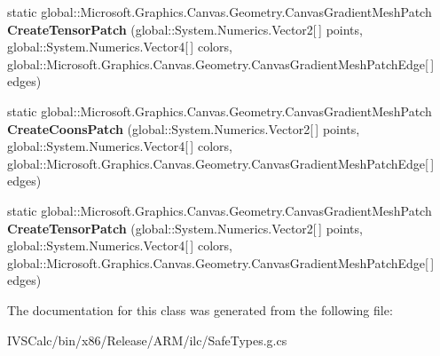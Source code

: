 \begin{DoxyCompactItemize}
static global\+::\+Microsoft.\+Graphics.\+Canvas.\+Geometry.\+Canvas\+Gradient\+Mesh\+Patch {\bfseries Create\+Tensor\+Patch} (global\+::\+System.\+Numerics.\+Vector2\mbox{[}$\,$\mbox{]} points, global\+::\+System.\+Numerics.\+Vector4\mbox{[}$\,$\mbox{]} colors, global\+::\+Microsoft.\+Graphics.\+Canvas.\+Geometry.\+Canvas\+Gradient\+Mesh\+Patch\+Edge\mbox{[}$\,$\mbox{]} edges)
\item 
\mbox{\label{class_microsoft_1_1_graphics_1_1_canvas_1_1_geometry_1_1_canvas_gradient_mesh_a1250e69d906353253b5c257cb7b7fb9f}} 
static global\+::\+Microsoft.\+Graphics.\+Canvas.\+Geometry.\+Canvas\+Gradient\+Mesh\+Patch {\bfseries Create\+Coons\+Patch} (global\+::\+System.\+Numerics.\+Vector2\mbox{[}$\,$\mbox{]} points, global\+::\+System.\+Numerics.\+Vector4\mbox{[}$\,$\mbox{]} colors, global\+::\+Microsoft.\+Graphics.\+Canvas.\+Geometry.\+Canvas\+Gradient\+Mesh\+Patch\+Edge\mbox{[}$\,$\mbox{]} edges)
\item 
\mbox{\label{class_microsoft_1_1_graphics_1_1_canvas_1_1_geometry_1_1_canvas_gradient_mesh_a354ddcec29b2b78440f0ed1529ae8d0d}} 
static global\+::\+Microsoft.\+Graphics.\+Canvas.\+Geometry.\+Canvas\+Gradient\+Mesh\+Patch {\bfseries Create\+Tensor\+Patch} (global\+::\+System.\+Numerics.\+Vector2\mbox{[}$\,$\mbox{]} points, global\+::\+System.\+Numerics.\+Vector4\mbox{[}$\,$\mbox{]} colors, global\+::\+Microsoft.\+Graphics.\+Canvas.\+Geometry.\+Canvas\+Gradient\+Mesh\+Patch\+Edge\mbox{[}$\,$\mbox{]} edges)
\end{DoxyCompactItemize}


The documentation for this class was generated from the following file\+:\begin{DoxyCompactItemize}
\item 
I\+V\+S\+Calc/bin/x86/\+Release/\+A\+R\+M/ilc/Safe\+Types.\+g.\+cs\end{DoxyCompactItemize}
